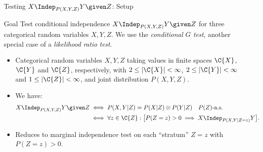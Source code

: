 
\begin{frame}{Testing $X \Indep_{P(X,Y,Z)} Y \given Z$: Setup}
  \begin{block}{Goal}
    Test conditional independence $X \Indep_{P(X,Y,Z)} Y \given Z$ for three categorical random variables $X,Y,Z$.
    We use the \emph{conditional $G$ test}, another special case of a \emph{likelihood ratio test}.
  \end{block}
  \begin{itemize}
    \item Categorical random variables $X,Y,Z$ taking values in finite spaces $\C{X}$, $\C{Y}$
and $\C{Z}$, respectively, with $2 \le |\C{X}| < \infty$, $2 \le |\C{Y}| < \infty$ and $1 \le |\C{Z}| < \infty$, and joint distribution $P(X,Y,Z)$.
    \item We have:
      \begin{equation*}\begin{split}
        X \Indep_{P(X,Y,Z)} Y \given Z 
        & \iff P(X,Y | Z) = P(X | Z) \otimes P(Y | Z) \quad \text{$P(Z)$-a.s.} \\
        & \iff \forall z \in \C{Z}: \big[P(Z=z) > 0 \implies X \Indep_{P(X,Y \mid Z=z)} Y \big].
      \end{split}\end{equation*}
    \item Reduces to marginal independence test on each ``stratum'' $Z=z$ with $P(Z=z) > 0$.
  \end{itemize}
\end{frame}

